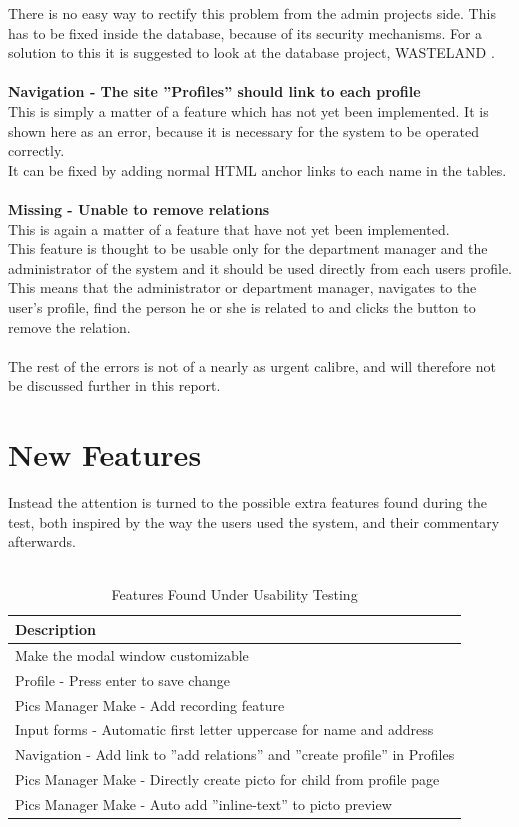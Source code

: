 There is no easy way to rectify this problem from the admin projects side. This has to be fixed inside the database, because of its security mechanisms. For a solution to this it is suggested to look at the database project, WASTELAND \citep{wasteland}.\\
\\
\textbf{Navigation - The site ''Profiles'' should link to each profile}\\
This is simply a matter of a feature which has not yet been implemented. It is shown here as an error, because it is necessary for the system to be operated correctly.\\
It can be fixed by adding normal HTML anchor links to each name in the tables.\\
\\
\textbf{Missing - Unable to remove relations}\\
This is again a matter of a feature that have not yet been implemented.\\
This feature is thought to be usable only for the department manager and the administrator of the system and it should be used directly from each users profile. This means that the administrator or department manager, navigates to the user's profile, find the person he or she is related to and clicks the button to remove the relation.\\
\\
The rest of the errors is not of a nearly as urgent calibre, and will therefore not be discussed further in this report.\\

\section{New Features}
Instead the attention is turned to the possible extra features found during the test, both inspired by the way the users used the system, and their commentary afterwards.\\
\\

\begin{table}[htbp]
	\centering
		\begin{tabular}{|l|}
			\hline
			Description\\\hline\hline
			Make the modal window customizable \\\hline
			Profile - Press enter to save change \\\hline
			Pics Manager Make - Add recording feature\\\hline
			Input forms - Automatic first letter uppercase for name and address\\\hline  
			Navigation - Add link to ''add relations'' and ''create profile'' in Profiles \\\hline  
			Pics Manager Make - Directly create picto for child from profile page \\\hline
			Pics Manager Make - Auto add ''inline-text'' to picto preview \\\hline
		\end{tabular}
	\caption{Features Found Under Usability Testing}
	\label{tab:NewFeature}
\end{table}	

